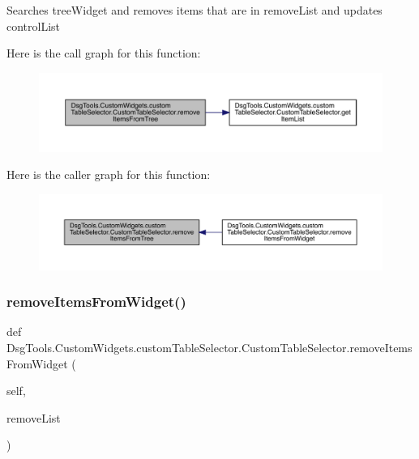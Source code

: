 \begin{DoxyVerb}Searches treeWidget and removes items that are in removeList and updates controlList
\end{DoxyVerb}
 Here is the call graph for this function\+:
\nopagebreak
\begin{figure}[H]
\begin{center}
\leavevmode
\includegraphics[width=350pt]{class_dsg_tools_1_1_custom_widgets_1_1custom_table_selector_1_1_custom_table_selector_ae65f65b45d6ed93537e89c028313aef5_cgraph}
\end{center}
\end{figure}
Here is the caller graph for this function\+:
\nopagebreak
\begin{figure}[H]
\begin{center}
\leavevmode
\includegraphics[width=350pt]{class_dsg_tools_1_1_custom_widgets_1_1custom_table_selector_1_1_custom_table_selector_ae65f65b45d6ed93537e89c028313aef5_icgraph}
\end{center}
\end{figure}
\mbox{\label{class_dsg_tools_1_1_custom_widgets_1_1custom_table_selector_1_1_custom_table_selector_aeb271b962b6d72639c03fe4887cc73f9}} 
\subsubsection{\texorpdfstring{remove\+Items\+From\+Widget()}{removeItemsFromWidget()}}
{\footnotesize\ttfamily def Dsg\+Tools.\+Custom\+Widgets.\+custom\+Table\+Selector.\+Custom\+Table\+Selector.\+remove\+Items\+From\+Widget (\begin{DoxyParamCaption}\item[{}]{self,  }\item[{}]{remove\+List }\end{DoxyParamCaption})}

